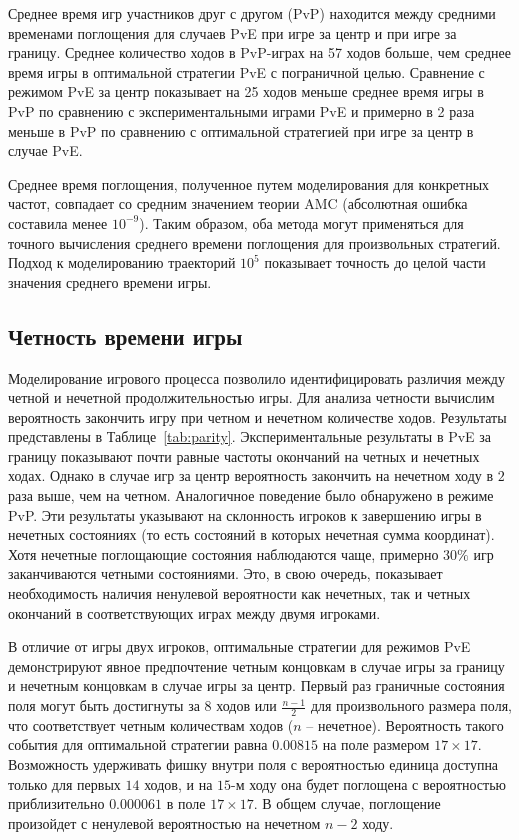 Среднее время игр участников друг с другом (PvP) находится между средними временами поглощения для случаев PvE при игре за центр и при игре за границу. Среднее количество ходов в PvP-играх на 57 ходов больше, чем среднее время игры в оптимальной стратегии PvE с пограничной целью. Сравнение с режимом PvE за центр показывает на 25 ходов меньше среднее время игры в PvP по сравнению с экспериментальными играми PvE и примерно в 2 раза меньше в PvP по сравнению с оптимальной стратегией при игре за центр в случае PvE.

Среднее время поглощения, полученное путем моделирования для конкретных частот, совпадает со средним значением теории AMC (абсолютная ошибка составила менее $10^{-9}$). Таким образом, оба метода могут применяться для точного вычисления среднего времени поглощения для произвольных стратегий. Подход к моделированию траекторий $10^5$ показывает точность до целой части значения среднего времени игры.

\subsection{Четность времени игры}\label{subsec:ch3/sec4/sub2}

Моделирование игрового процесса позволило идентифицировать различия между четной и нечетной продолжительностью игры. Для анализа четности вычислим вероятность закончить игру при четном и нечетном количестве ходов. Результаты представлены в Таблице~\cref{tab:parity}. Экспериментальные результаты в PvE за границу показывают почти равные частоты окончаний на четных и нечетных ходах. Однако в случае игр за центр вероятность закончить на нечетном ходу в $2$ раза выше, чем на четном. Аналогичное поведение было обнаружено в режиме PvP. Эти результаты указывают на склонность игроков к завершению игры в нечетных состояниях (то есть состояний в которых нечетная сумма координат). Хотя нечетные поглощающие состояния наблюдаются чаще, примерно $30\%$ игр заканчиваются четными состояниями. Это, в свою очередь, показывает необходимость наличия ненулевой вероятности как нечетных, так и четных окончаний в соответствующих играх между двумя игроками.

В отличие от игры двух игроков, оптимальные стратегии для режимов PvE демонстрируют явное предпочтение четным концовкам в случае игры за границу и нечетным концовкам в случае игры за центр. Первый раз граничные состояния поля могут быть достигнуты за $8$ ходов или $\frac{n-1}{2}$ для произвольного размера поля, что соответствует четным количествам ходов ($n$ -- нечетное). Вероятность такого события для оптимальной стратегии равна $0.00815$ на поле размером $17 \times 17$. Возможность удерживать фишку внутри поля с вероятностью единица доступна только для первых $14$ ходов, и на $15$-м ходу она будет поглощена с вероятностью приблизительно $0.000061$ в поле $17 \times 17$. В общем случае, поглощение произойдет с ненулевой вероятностью на нечетном $n-2$ ходу.

